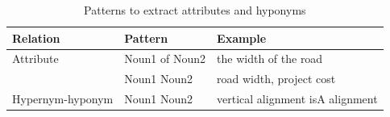 \documentclass[Journal,InsideFigs, DoubleSpace]{ascelike} %
\begin{document}
{\begin{algorithm}[h]
\begin{algorithmic}[1]
		\EndProcedure
	\end{algorithmic}
\end{algorithm}
%
%
\begin{table} [t]
	\caption{Patterns to extract attributes and hyponyms}
	\label{table:attribute_pattern}
	\centering
	\small
	\renewcommand{\arraystretch}{1.25}
	\begin{tabular}{l l l}
		\hline
		\textbf{Relation} & \textbf{Pattern} & \textbf{Example}\\
		\hline
		Attribute &	Noun1 of Noun2 & the width of the road\\
		& Noun1 Noun2	&	road width, project cost\\
		Hypernym-hyponym & Noun1 Noun2 & vertical alignment isA alignment\\
		\hline
	\end{tabular}
	\normalsize
\end{table}
%

}
\end{document}
